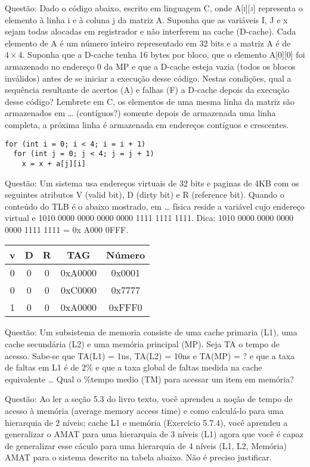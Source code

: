 \documentclass{article}
\begin{document}
Questão: Dado o código abaixo, escrito em linguagem C, onde \textsc{A[i][j]}
representa o elemento à linha i e à coluna j da matriz A. Suponha que as
variáveis I, J e x sejam todas alocadas em registrador e não interferem na cache
(D-cache). Cada elemento de A é um número inteiro representado em 32 bits e a
matriz A é de $4\times4$. Suponha que a D-cache tenha 16 bytes por bloco, que o
elemento \textsc{A[0][0]} foi armazenado no endereço 0 da MP e que a D-cache
esteja vazia (todos os blocos inválidos) antes de se iniciar a execução desse
código. Nestas condições, qual a sequência resultante de acertos (A) e falhas
(F) a D-cache depois da execução desse código? Lembrete em C, os elementos de
uma mesma linha da matriz são armazenados em … (contíguos?) somente depois de
armazenada uma linha completa, a próxima linha é armazenada em endereços
contíguos e crescentes.

\begin{verbatim}
for (int i = 0; i < 4; i = i + 1)
  for (int j = 0; j < 4; j = j + 1)
    x = x + a[j][i]
\end{verbatim}

Questão: Um sistema usa endereços virtuais de 32 bits e paginas de 4KB com os
seguintes atributos V (valid bit), D (dirty bit) e R (reference bit). Quando o
conteúdo do TLB é o abaixo mostrado, em … física reside a variável cujo
endereço virtual e 1010 0000 0000 0000 0000 1111 1111 1111. Dica: 1010 0000
0000 0000 0000 1111 1111 = 0x A000 0FFF.

\begin{tabular}{|c|c|c|c|c|}
\hline v & D & R & TAG & Número \\
\hline 0 & 0 & 0 & 0xA0000 & 0x0001 \\
\hline 0 & 0 & 0 & 0xC0000 & 0x7777 \\
\hline 1 & 0 & 0 & 0xA0000 & 0xFFF0 \\
\hline
\end{tabular}

Questão: Um subsistema de memoria consiste de uma cache primaria (L1), uma cache
secundária (L2) e uma memória principal (MP). Seja TA o tempo de acesso. Sabe-se
que TA(L1) = 1ns, TA(L2) = 10ns e TA(MP) = ? e que a taxa de faltas em L1 é de
2\% e que a taxa global de faltas medida na cache equivalente … Qual o \%tempo
medio (TM) para acessar um item em memória?

Questão: Ao ler a seção 5.3 do livro texto,  você aprendeu a noção de tempo de
acesso à memória (average memory access time) e como calculá-lo para uma
hierarquia de 2 níveis; cache L1 e memória (Exercicio 5.7.4), você aprendeu a
generalizar o AMAT para uma hierarquia de 3 níveis (L1) agora que você é capaz
de generalizar esse cáculo para uma hierarquia de 4 níveis (L1, L2, Memória)
AMAT para o sistema descrito na tabela abaixo. Não é preciso justificar.
\end{document}
